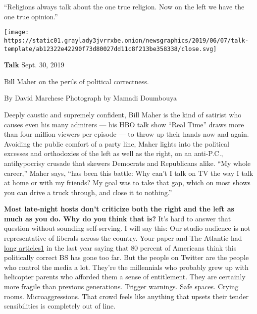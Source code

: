 ``Religions always talk about the one true religion. Now on the left we
have the one true opinion.''

\texttt{[image: https://static01.graylady3jvrrxbe.onion/newsgraphics/2019/06/07/talk-template/ab12322e42290f73d80027dd11c8f213be358338/close.svg]}

\textbf{Talk} Sept. 30, 2019

Bill Maher on the perils of political correctness.

By David Marchese Photograph by Mamadi Doumbouya

Deeply caustic and supremely confident, Bill Maher is the kind of
satirist who causes even his many admirers --- his HBO talk show ``Real
Time'' draws more than four million viewers per episode --- to throw up
their hands now and again. Avoiding the public comfort of a party line,
Maher lights into the political excesses and orthodoxies of the left as
well as the right, on an anti-P.C., antihypocrisy crusade that skewers
Democrats and Republicans alike. ``My whole career,'' Maher says, ``has
been this battle: Why can't I talk on TV the way I talk at home or with
my friends? My goal was to take that gap, which on most shows you can
drive a truck through, and close it to nothing.''

\textbf{Most late-night hosts don't criticize both the right and the
left as much as you do. Why do you think that is?} It's hard to answer
that question without sounding self-serving. I will say this: Our studio
audience is not representative of liberals across the country. Your
paper and The Atlantic had
\href{http://nytimes3xbfgragh.onion\#tooltip-1}{long articles1} in the
last year saying that 80 percent of Americans think this politically
correct BS has gone too far. But the people on Twitter are the people
who control the media a lot. They're the millennials who probably grew
up with helicopter parents who afforded them a sense of entitlement.
They are certainly more fragile than previous generations. Trigger
warnings. Safe spaces. Crying rooms. Microaggressions. That crowd feels
like anything that upsets their tender sensibilities is completely out
of line.

